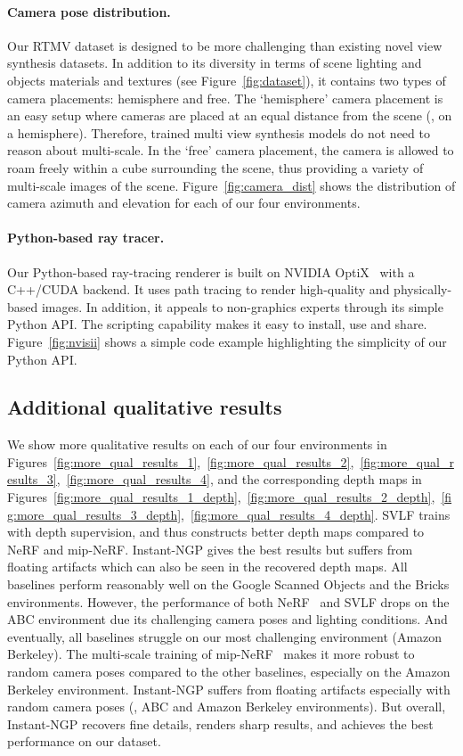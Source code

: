 \paragraph{Camera pose distribution.}
Our RTMV dataset is designed to be more challenging than existing novel view synthesis datasets.
In addition to its diversity in terms of scene lighting and objects materials and textures (see Figure~\ref{fig:dataset}),
it contains two types of camera placements: hemisphere and free.
The `hemisphere' camera placement is an easy setup where cameras are placed at an equal distance from the scene (\ie, on a hemisphere).
Therefore, trained multi view synthesis models do not need to reason about multi-scale.
In the `free' camera placement, the camera is allowed to roam freely within a cube surrounding the scene,
thus providing a variety of multi-scale images of the scene.
Figure~\ref{fig:camera_dist} shows the distribution of camera azimuth and elevation for each of our four environments.

\paragraph{Python-based ray tracer.}
Our Python-based ray-tracing renderer is built on NVIDIA OptiX~\cite{optix} with a C++/CUDA backend.
It uses path tracing to render high-quality and physically-based images.
In addition, it appeals to non-graphics experts through its simple Python API.
The scripting capability makes it easy to install, use and share.
Figure~\ref{fig:nvisii} shows a simple code example highlighting the simplicity of our Python API.

\subsection{Additional qualitative results}
We show more qualitative results on each of our four environments in Figures~\ref{fig:more_qual_results_1},~\ref{fig:more_qual_results_2},~\ref{fig:more_qual_results_3},~\ref{fig:more_qual_results_4},
and the corresponding depth maps in Figures~\ref{fig:more_qual_results_1_depth},~\ref{fig:more_qual_results_2_depth},~\ref{fig:more_qual_results_3_depth},~\ref{fig:more_qual_results_4_depth}.
SVLF trains with depth supervision, and thus constructs better depth maps compared to NeRF and mip-NeRF.
Instant-NGP gives the best results but suffers from floating artifacts which can also be seen in the recovered depth maps.
All baselines perform reasonably well on the Google Scanned Objects and the Bricks environments.
However, the performance of both NeRF~\cite{mildenhall2020nerf} and SVLF drops on the ABC environment due its challenging camera poses and lighting conditions.
And eventually, all baselines struggle on our most challenging environment (Amazon Berkeley).
The multi-scale training of mip-NeRF~\cite{barron2021mip} makes it more robust to random camera poses compared to the other baselines, especially on the Amazon Berkeley environment.
Instant-NGP suffers from floating artifacts especially with random camera poses (\eg, ABC and Amazon Berkeley environments).
But overall, Instant-NGP recovers fine details, renders sharp results, and achieves the best performance on our dataset.

